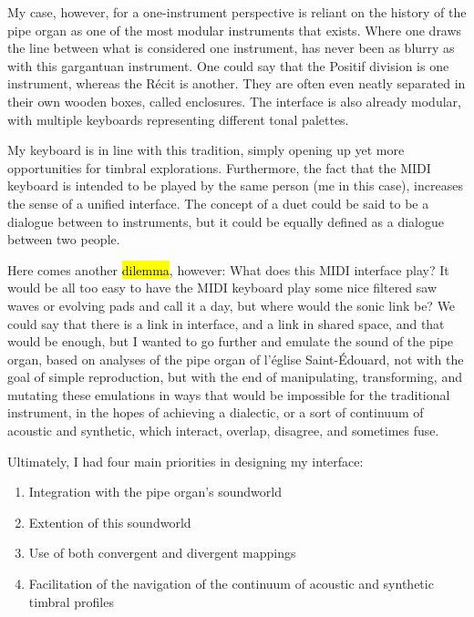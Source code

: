 \documentclass[12pt,twoside,maitrise]{dms_ks}
\theoremstyle{definition}
\begin{document}
{My case, however, for a one-instrument perspective is reliant on the history of the pipe organ as one of the most modular instruments that exists.
Where one draws the line between what is considered one instrument, has never been as blurry as with this gargantuan instrument.
One could say that the Positif division is one instrument, whereas the Récit is another.
They are often even neatly separated in their own wooden boxes, called enclosures.
The interface is also already modular, with multiple keyboards representing different tonal palettes.

My keyboard is in line with this tradition, simply opening up yet more opportunities for timbral explorations.
Furthermore, the fact that the MIDI keyboard is intended to be played by the same person (me in this case), increases the sense of a unified interface.
The concept of a duet could be said to be a dialogue between to instruments, but it could be equally defined as a dialogue between two people.

Here comes another \hl{dilemma}, however: What does this MIDI interface play?
It would be all too easy to have the MIDI keyboard play some nice filtered saw waves or evolving pads and call it a day, but where would the sonic link be?
We could say that there is a link in interface, and a link in shared space, and that would be enough, but I wanted to go further and emulate the sound of the pipe organ, based on analyses of the pipe organ of l'église Saint-Édouard, not with the goal of simple reproduction, but with the end of manipulating, transforming, and mutating these emulations in ways that would be impossible for the traditional instrument, in the hopes of achieving a dialectic, or a sort of continuum of acoustic and synthetic, which interact, overlap, disagree, and sometimes fuse.


Ultimately, I had four main priorities in designing my interface:

\begin{enumerate}
  \item Integration with the pipe organ's soundworld

  \item Extention of this soundworld
   
  \item Use of both convergent and divergent mappings

  \item Facilitation of the navigation of the continuum of acoustic
and synthetic timbral profiles
\end{enumerate}

}
\end{document}
